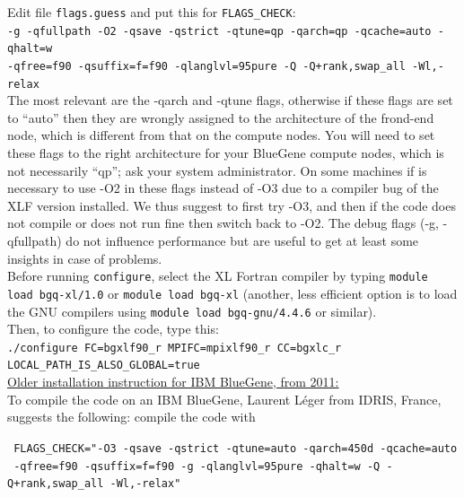 \documentclass[oneside,english]{book}
\begin{document}
\noindent
Edit file \texttt{flags.guess} and put this for \texttt{FLAGS\_CHECK}:\\

\noindent
\texttt{-g -qfullpath -O2 -qsave -qstrict -qtune=qp -qarch=qp -qcache=auto -qhalt=w}\\
\noindent
\texttt{-qfree=f90 -qsuffix=f=f90 -qlanglvl=95pure -Q -Q+rank,swap\_all -Wl,-relax}\\

\noindent
The most relevant are the -qarch and -qtune flags, otherwise if these flags are set to ``auto'' then they are wrongly assigned to
the architecture of the frond-end node, which is different from that on the compute nodes.
You will need to set these flags to the right architecture for your BlueGene compute nodes, which is not necessarily ``qp'';
ask your system administrator.
On some machines if is necessary to use -O2 in these flags instead of -O3 due to a compiler bug of the XLF version installed.
We thus suggest to first try -O3, and then if the code does not compile or does not run fine then switch back to -O2.
The debug flags (-g, -qfullpath) do not influence performance but are useful to get at least some insights in case of problems.\\

\noindent
Before running \texttt{configure}, select the XL Fortran compiler by typing \texttt{module load bgq-xl/1.0}
or \texttt{module load bgq-xl} (another, less efficient option is to load the GNU compilers using \texttt{module load bgq-gnu/4.4.6} or similar).\\

\noindent
Then, to configure the code, type this:\\

\noindent
\texttt{./configure FC=bgxlf90\_r MPIFC=mpixlf90\_r CC=bgxlc\_r LOCAL\_PATH\_IS\_ALSO\_GLOBAL=true}\\

\noindent
\underline{Older installation instruction for IBM BlueGene, from 2011:}\\

\noindent
To compile the code on an IBM BlueGene, Laurent L\'eger from IDRIS, France, suggests the following: compile the code with

\noindent
\texttt{   FLAGS\_CHECK="-O3 -qsave -qstrict -qtune=auto -qarch=450d -qcache=auto \\}
\texttt{   -qfree=f90 -qsuffix=f=f90 -g -qlanglvl=95pure -qhalt=w -Q -Q+rank,swap\_all -Wl,-relax"}
\end{document}
